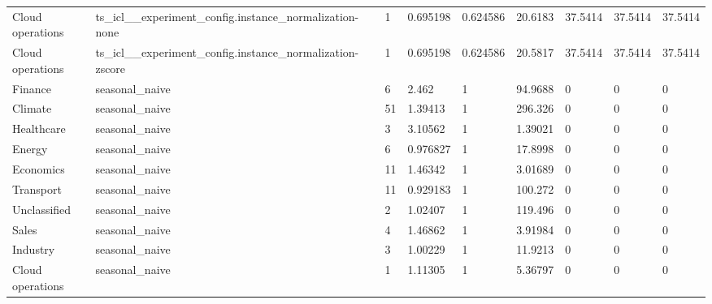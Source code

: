 \begin{tabular}{lllllllll}
Cloud operations & ts\_icl\_\_experiment\_config.instance\_normalization-none & 1 & 0.695198 & 0.624586 & 20.6183 & 37.5414 & 37.5414 & 37.5414 \\
Cloud operations & ts\_icl\_\_experiment\_config.instance\_normalization-zscore & 1 & 0.695198 & 0.624586 & 20.5817 & 37.5414 & 37.5414 & 37.5414 \\
Finance & seasonal\_naive & 6 & 2.462 & 1 & 94.9688 & 0 & 0 & 0 \\
Climate & seasonal\_naive & 51 & 1.39413 & 1 & 296.326 & 0 & 0 & 0 \\
Healthcare & seasonal\_naive & 3 & 3.10562 & 1 & 1.39021 & 0 & 0 & 0 \\
Energy & seasonal\_naive & 6 & 0.976827 & 1 & 17.8998 & 0 & 0 & 0 \\
Economics & seasonal\_naive & 11 & 1.46342 & 1 & 3.01689 & 0 & 0 & 0 \\
Transport & seasonal\_naive & 11 & 0.929183 & 1 & 100.272 & 0 & 0 & 0 \\
Unclassified & seasonal\_naive & 2 & 1.02407 & 1 & 119.496 & 0 & 0 & 0 \\
Sales & seasonal\_naive & 4 & 1.46862 & 1 & 3.91984 & 0 & 0 & 0 \\
Industry & seasonal\_naive & 3 & 1.00229 & 1 & 11.9213 & 0 & 0 & 0 \\
Cloud operations & seasonal\_naive & 1 & 1.11305 & 1 & 5.36797 & 0 & 0 & 0 \\
\bottomrule
\end{tabular}
